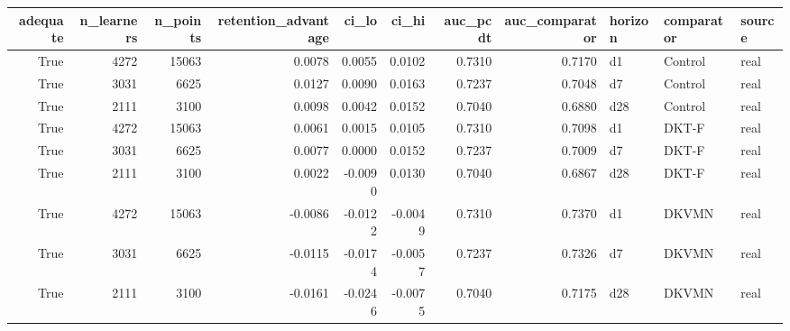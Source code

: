 \begin{tabular}{rrrrrrrrlll}
\toprule
adequate & n\_learners & n\_points & retention\_advantage & ci\_lo & ci\_hi & auc\_pcdt & auc\_comparator & horizon & comparator & source \\
\midrule
True & 4272 & 15063 & 0.0078 & 0.0055 & 0.0102 & 0.7310 & 0.7170 & d1 & Control & real \\
True & 3031 & 6625 & 0.0127 & 0.0090 & 0.0163 & 0.7237 & 0.7048 & d7 & Control & real \\
True & 2111 & 3100 & 0.0098 & 0.0042 & 0.0152 & 0.7040 & 0.6880 & d28 & Control & real \\
True & 4272 & 15063 & 0.0061 & 0.0015 & 0.0105 & 0.7310 & 0.7098 & d1 & DKT-F & real \\
True & 3031 & 6625 & 0.0077 & 0.0000 & 0.0152 & 0.7237 & 0.7009 & d7 & DKT-F & real \\
True & 2111 & 3100 & 0.0022 & -0.0090 & 0.0130 & 0.7040 & 0.6867 & d28 & DKT-F & real \\
True & 4272 & 15063 & -0.0086 & -0.0122 & -0.0049 & 0.7310 & 0.7370 & d1 & DKVMN & real \\
True & 3031 & 6625 & -0.0115 & -0.0174 & -0.0057 & 0.7237 & 0.7326 & d7 & DKVMN & real \\
True & 2111 & 3100 & -0.0161 & -0.0246 & -0.0075 & 0.7040 & 0.7175 & d28 & DKVMN & real \\
\bottomrule
\end{tabular}
